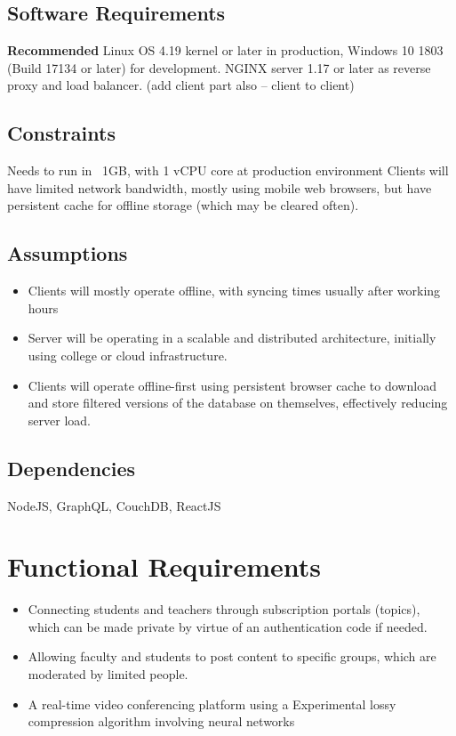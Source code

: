 \subsection{Software Requirements}

\textbf{Recommended}
Linux OS 4.19 kernel or later in production, Windows 10 1803 (Build 17134 or later) for development.
NGINX server 1.17 or later as reverse proxy and load balancer.
(add client part also -- client to client)

\subsection{Constraints}

Needs to run in ~1GB, with 1 vCPU core at production environment
Clients will have limited network bandwidth, mostly using mobile web browsers, but 
have persistent cache for offline storage (which may be cleared often).

\subsection{Assumptions}

\begin{itemize}
    \item Clients will mostly operate offline, with syncing times usually after working hours
    \item Server will be operating in a scalable and distributed architecture, initially using college or cloud infrastructure.
    \item Clients will operate offline-first using persistent browser cache to download and store filtered versions of the database on themselves, effectively reducing server load.
\end{itemize}

\subsection{Dependencies}

NodeJS, GraphQL, CouchDB, ReactJS

\section{Functional Requirements}

\begin{itemize}
    \item Connecting students and teachers through subscription portals (topics), which can be made private by virtue of an authentication code if needed.
    \item Allowing faculty and students to post content to specific groups, which are moderated by limited people.
    \item A real-time video conferencing platform using a Experimental lossy compression algorithm involving neural networks
\end{itemize}

